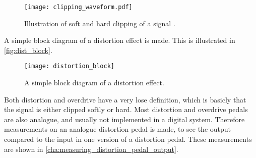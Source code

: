 \begin{figure}[htbp]
    \centering
    \texttt{[image: clipping\_waveform.pdf]}
    \caption{Illustration of soft and hard clipping of a signal \citep{clipping_fig}.}
    \label{fig:clipping_waveform}
\end{figure}

A simple block diagram of a distortion effect is made. This is illustrated in \autoref{fig:dist_block}.

\begin{figure}[htbp]
    \centering
    \texttt{[image: distortion\_block]}
    \caption{A simple block diagram of a distortion effect.}
    \label{fig:dist_block}
\end{figure}

Both distortion and overdrive have a very lose definition, which is basicly that the signal is either clipped softly or hard. Most distortion and overdrive pedals are also analogue, and usually not implemented in a digital system. Therefore measurements on an analogue distortion pedal is made, to see the output compared to the input in one version of a distortion pedal. These measurements are shown in \autoref{cha:measuring_distortion_pedal_output}. 